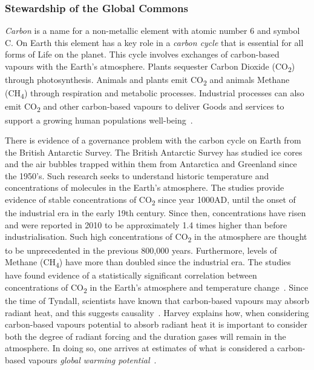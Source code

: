 \documentclass[11pt, oneside]{book}   	%
\begin{document}
\subsubsection{Stewardship of the Global Commons}
\emph{Carbon} is a name for a non-metallic element with atomic number 6 and symbol C.
On Earth this element has a key role in a \emph{carbon cycle} that is essential for all forms of Life on the planet.
This cycle involves exchanges of carbon-based vapours with the Earth's atmosphere.
Plants sequester Carbon Dioxide (CO\textsubscript{2}) through photosynthesis.
Animals and plants emit CO\textsubscript{2} and animals Methane (CH\textsubscript{4}) through respiration and metabolic processes.
Industrial processes can also emit CO\textsubscript{2} and other carbon-based vapours to deliver Goods and services to support a growing human populations well-being~\cite{ng1}.\

There is evidence of a governance problem with the carbon cycle on Earth from the British Antarctic Survey.
The British Antarctic Survey has studied ice cores and the air bubbles trapped within them from Antarctica and Greenland since the 1950’s.
Such research seeks to understand historic temperature and concentrations of molecules in the Earth’s atmosphere.
The studies provide evidence of stable concentrations of CO\textsubscript{2} since year 1000AD, until the onset of the industrial era in the early 19th century.
Since then, concentrations have risen and were reported in 2010 to be approximately 1.4 times higher than before industrialisation.
Such high concentrations of CO\textsubscript{2} in the atmosphere are thought to be unprecedented in the previous 800,000 years. Furthermore, levels of Methane (CH\textsubscript{4}) have more than doubled since the industrial era.
The studies have found evidence of a statistically significant correlation between concentrations of CO\textsubscript{2} in the Earth’s atmosphere and temperature change~\cite{ba1}.
Since the time of Tyndall, scientists have known that carbon-based vapours may absorb radiant heat, and this suggests causality~\cite{td1}.
Harvey explains how, when considering carbon-based vapours potential to absorb radiant heat it is important to consider both the degree of radiant forcing and the duration gases will remain in the atmosphere.
In doing so, one arrives at estimates of what is considered a carbon-based vapours \emph{global warming potential}~\cite{dldh1}.\
\end{document}
